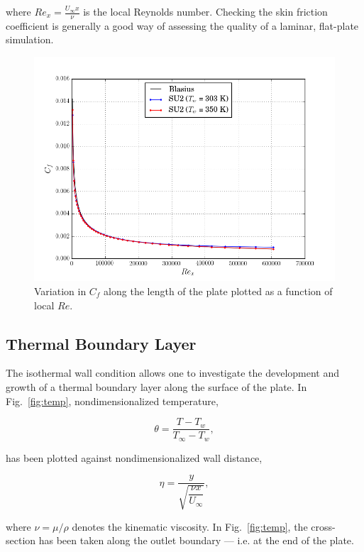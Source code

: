 \documentclass[12pt,letterpaper]{article}
\begin{document}
where $Re_x = \tfrac{U_\infty x}{\nu}$ is the local Reynolds number. Checking the skin friction coefficient is generally a good way of assessing the quality of a laminar, flat-plate simulation.

\begin{figure}[h] 
\centering
\includegraphics[width=\linewidth]{cf.png}
\caption{Variation in $C_f$ along the length of the plate plotted as a function of local $Re$.}
\label{fig:cf}
\end{figure}

\subsection*{Thermal Boundary Layer}
The isothermal wall condition allows one to investigate the development and growth of a thermal boundary layer along the surface of the plate. In Fig.~\ref{fig:temp}, nondimensionalized temperature, 

\begin{equation*}
\theta = \dfrac{T-T_w}{T_\infty-T_w},
\end{equation*}

has been plotted against nondimensionalized wall distance,

\begin{equation*}
\eta = \dfrac{y}{\sqrt{\dfrac{\nu x}{U_\infty}}},
\end{equation*}

where $\nu = \mu/\rho$ denotes the kinematic viscosity. In Fig.~\ref{fig:temp}, the cross-section has been taken along the outlet boundary --- i.e. at the end of the plate.
\end{document}
